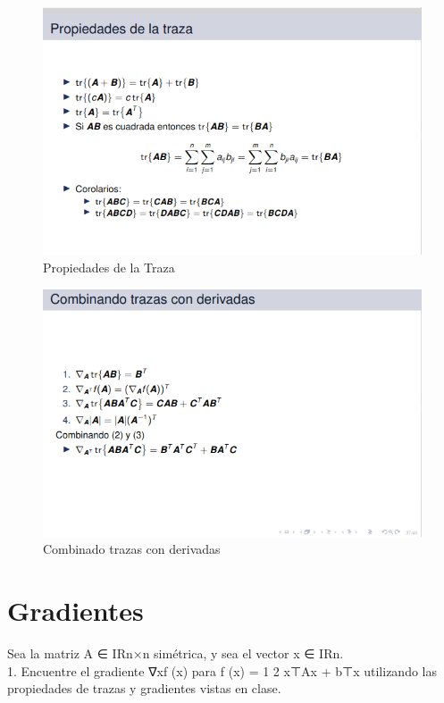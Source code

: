 \documentclass[12pt,letterpaper]{article}
\begin{document}
\begin{figure}[H]
    \centering
    \includegraphics[scale=0.55]{A&A_GAF_HW01/fig/A&A_HW01_02.png}
    \caption{Propiedades de la Traza \cite{Teoría3.1_p35}   }
    \label{fig:MV4}
\end{figure}

\begin{figure}[H]
    \centering
    \includegraphics[scale=0.55]{A&A_GAF_HW01/fig/A&A_HW01_03.png}
    \caption{Combinado trazas con derivadas\cite{Teoría3.1_p35}   }
    \label{fig:MV4}
\end{figure}
\section{Gradientes} 
Sea la matriz A ∈ IRn×n simétrica, y sea el vector x ∈ IRn.
\\
1. Encuentre el gradiente ∇xf (x) para f (x) = 1 2 x⊤Ax + b⊤x utilizando las propiedades de trazas y gradientes vistas en clase.
\end{document}
